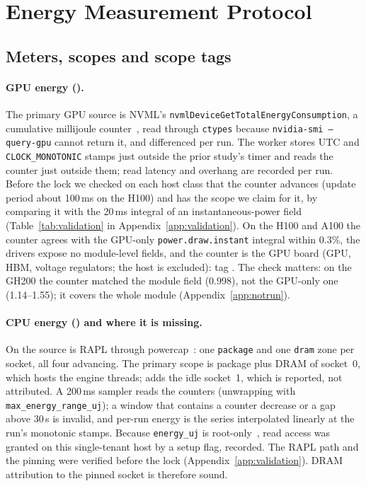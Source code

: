 \documentclass[sigconf]{acmart}
\begin{document}
\section{Energy Measurement Protocol}
\label{sec:energy}

\subsection{Meters, scopes and scope tags}
\label{sec:scopes}

\paragraph{GPU energy ().}
The primary GPU source is NVML's \texttt{nvmlDeviceGetTotalEnergyConsumption}, a cumulative
millijoule counter~\cite{nvml_api}, read through \texttt{ctypes} because \texttt{nvidia-smi
--query-gpu} cannot return it, and differenced per run. The worker stores UTC and
\texttt{CLOCK\_MONOTONIC} stamps just outside the prior study's timer and reads the counter just outside
them; read latency and overhang are recorded per run. Before the lock we checked on each
host class that the counter advances (update period about 100\,ms on the H100) and has the
scope we claim for it, by comparing it with the 20\,ms integral of an instantaneous-power field
(Table~\ref{tab:validation} in Appendix~\ref{app:validation}). On the H100 and A100 the counter
agrees with the GPU-only
\texttt{power.draw.instant} integral within 0.3\%, the drivers expose no module-level fields, and
the counter is the GPU board (GPU, HBM, voltage regulators; the host is excluded): tag
. The check matters: on the GH200 the counter matched the module field (0.998),
not the GPU-only one (1.14--1.55); it covers the whole module (Appendix~\ref{app:notrun}).

\paragraph{CPU energy () and where it is missing.}
\label{sec:cpuenergy}
On \CG{} the source is RAPL through powercap~\cite{linux_powercap}: one \texttt{package} and one
\texttt{dram} zone per socket, all four advancing. The primary scope  is package
plus DRAM of socket~0, which hosts the engine threads;  adds the idle socket~1,
which is reported, not attributed. A 200\,ms sampler reads the counters (unwrapping with
\texttt{max\_energy\_range\_uj}); a window that contains a counter decrease or a gap above 30\,s
is invalid, and per-run energy is the series interpolated linearly at the run's monotonic stamps.
Because \texttt{energy\_uj} is root-only~\cite{lipp2021platypus}, read access was granted on this
single-tenant host by a setup flag, recorded. The RAPL path and the pinning were verified before the lock (Appendix~\ref{app:validation}). DRAM attribution to the pinned socket is therefore sound.
\end{document}
